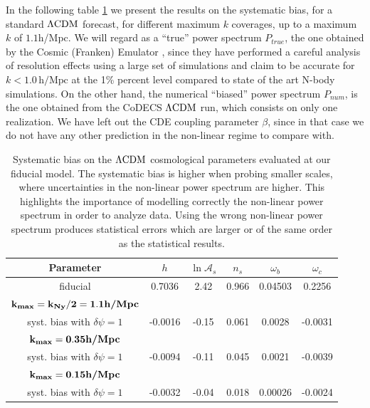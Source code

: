 In the following table \ref{tab:systbias} we present the results
on the systematic bias, for a standard $\Lambda\mathrm{CDM}$ forecast, for different
maximum $k$ coverages, up to a maximum $k$ of $1.1$h/Mpc. We will
regard as a ``true'' power spectrum $P_{true}$, the one obtained
by the Cosmic (Franken) Emulator \cite{heitmann_coyote_2014}, since
they have performed a careful analysis of resolution effects using
a large set of simulations and claim to be accurate for $k<1.0\,\mbox{h/Mpc}$
at the 1\% percent level compared to state of the art N-body simulations.
On the other hand, the numerical ``biased'' power spectrum $P_{num}$,
is the one obtained from the CoDECS $\Lambda\mathrm{CDM}$ run, which consists on
only one realization. We have left out the CDE coupling parameter
$\beta$, since in that case we do not have any other prediction in
the non-linear regime to compare with. 

\begin{table}[H]
\centering{}%
\begin{tabular}{|c|c|c|c|c|c|}
\hline 
\textbf{Parameter}  & $h$  & $\ln\mathcal{A}_{s}$  & $n_{s}$  & $\omega_{b}$  & $\omega_{c}$\tabularnewline
\hline 
fiducial  & 0.7036  & 2.42  & 0.966  & 0.04503  & 0.2256\tabularnewline
\hline 
\textbf{$\mathbf{k_{max}=k_{Ny}/2=1.1\mbox{\textbf{h/Mpc}}}$}  &  &  &  &  & \tabularnewline
syst. bias with $\delta\psi=1$ & -0.0016 & -0.15 & 0.061 & 0.0028 & -0.0031\tabularnewline
\hline 
\textbf{$\mathbf{k_{max}=0.35\mbox{\textbf{h/Mpc}}}$}  &  &  &  &  & \tabularnewline
\hline 
syst. bias with $\delta\psi=1$ & -0.0094 & -0.11 & 0.045 & 0.0021 & -0.0039\tabularnewline
\hline 
\textbf{$\mathbf{k_{max}=0.15\mbox{\textbf{h/Mpc}}}$}  &  &  &  &  & \tabularnewline
\hline 
syst. bias with $\delta\psi=1$ & -0.0032 & -0.04 & 0.018 & 0.00026 & -0.0024\tabularnewline
\hline 
\end{tabular}\protect
\caption[Systematic bias on the $\protect\lcdm$ cosmological
parameters.]{\label{tab:systbias} Systematic bias on the $\protect\lcdm$ cosmological
parameters evaluated at our fiducial model. The systematic bias is
higher when probing smaller scales, where uncertainties in the non-linear
power spectrum are higher. This highlights the importance of modelling
correctly the non-linear power spectrum in order to analyze data.
Using the wrong non-linear power spectrum produces statistical errors
which are larger or of the same order as the statistical results. }
\end{table}


